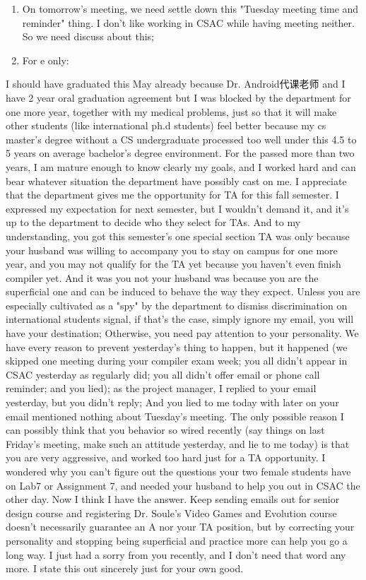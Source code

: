 \documentclass[12pt]{book}
\begin{document}
\begin{enumerate}
\item On tomorrow's meeting, we need settle down this "Tuesday meeting time and reminder" thing. I don't like working in CSAC while having meeting neither. So we need discuss about this;

\item For e only:
\end{enumerate}
I should have graduated this May already because Dr. Android代课老师 and I have 2 year oral graduation agreement but I was blocked by the department for one more year, together with my medical problems, just so that it will make other students (like international ph.d students) feel better because my cs master's degree without a CS undergraduate processed too well under this 4.5 to 5 years on average bachelor's degree environment. For the passed more than two years, I am mature enough to know clearly my goals, and I worked hard and can bear whatever situation the department have possibly cast on me. I appreciate that the department gives me the opportunity for TA for this fall semester. I expressed my expectation for next semester, but I wouldn't demand it, and it's up to the department to decide who they select for TAs. And to my understanding, you got this semester's one special section TA was only because your husband was willing to accompany you to stay on campus for one more year, and you may not qualify for the TA yet because you haven't even finish compiler yet. And it was you not your husband was because you are the superficial one and can be induced to behave the way they expect. 
Unless you are especially cultivated as a "spy" by the department to dismiss discrimination on international students signal, if that's the case, simply ignore my email, you will have your destination; Otherwise, you need pay attention to your personality. We have every reason to prevent yesterday's thing to happen, but it happened (we skipped one meeting during your compiler exam week; you all didn't appear in CSAC yesterday as regularly did; you all didn't offer email or phone call reminder; and you lied); as the project manager, I replied to your email yesterday, but you didn't reply; And you lied to me today with later on your email mentioned nothing about Tuesday's meeting. 
The only possible reason I can possibly think that you behavior so wired recently (say things on last Friday's meeting, make such an attitude yesterday, and lie to me today) is that you are very aggressive, and worked too hard just for a TA opportunity. I wondered why you can't figure out the questions your two female students have on Lab7 or Assignment 7, and needed your husband to help you out in CSAC the other day. Now I think I have the answer. Keep sending emails out for senior design course and registering Dr. Soule's Video Games and Evolution course doesn't necessarily guarantee an A nor your TA position, but by correcting your personality and stopping being superficial and practice more can help you go a long way. I just had a sorry from you recently, and I don't need that word any more. I state this out sincerely just for your own good. 
\end{document}
